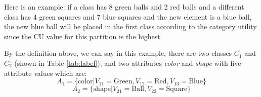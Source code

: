 Here is an example: if a class has 8 green balls and 2 red balls and a different class has 4 green squares and 7 blue squares and the new element is a blue ball, the new blue ball will be placed in the first class according to the category utility since the CU value for this partition is the highest.
\begin{table}[!ht]
\end{table}

By the definition above, we can say in this example, there are two classes $C_1$ and $C_2$ (shown in Table \ref{tab:label}), and two attributes \emph{color} and \emph{shape} with five attribute values which are: $$A_1=\{\text{color}|V_{11}=\text{Green},V_{12}=\text{Red}, V_{13}=\text{Blue}\}$$$$A_2=\{\text{shape}|V_{21}=\text{Ball}, V_{22}=\text{Square}\}$$

